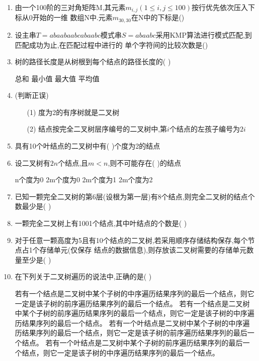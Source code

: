 \documentclass[12pt, a4paper, oneside, UTF8]{ctexbook}
\begin{document}
\begin{enumerate}
    \item \bl 由一个100阶的三对角矩阵M,其元素$m_{i,j}(1\leq i, j\leq 100)$按行优先依次压入下标从0开始的一维
    数组N中.元素$m_{30,30}$在N中的下标是() 

    \item \bl 设主串$T=abaabaabcabaabc$模式串$S=abaabc$采用KMP算法进行模式匹配,到匹配成功为止,在匹配过程中进行的
    单个字符间的比较次数是()
    

    \item 树的路径长度是从树根到每个结点的路径长度的(   ) 
    \begin{choices}
        \task 总和
        \task 最小值
        \task 最大值
        \task 平均值
    \end{choices}

    \item (判断正误) 
    \begin{enumerate}
        \item [(1)] 度为2的有序树就是二叉树
        \item [(2)] 结点按完全二叉树层序编号的二叉树中,第$i$个结点的左孩子编号为$2i$ 
    \end{enumerate}
    


    \item 具有10个叶结点的二叉树中有(   )个度为2的结点 
    

    \item 设二叉树有$2n$个结点,且$m<n$,则不可能存在(   )的结点 
    \begin{choices}
        \task n个度为0
        \task 2m个度为0
        \task 2m个度为1
        \task 2m个度为2
    \end{choices}


    \item 已知一颗完全二叉树的第6层(设根为第一层)有8个结点,则完全二叉树的结点个数最少是(   ) 


    \item 一颗完全二叉树上有1001个结点,其中叶结点的个数是(    ) 

    \item \bl 对于任意一颗高度为5且有10个结点的二叉树,若采用顺序存储结构保存,每个节点占1个存储单元(仅保存
    结点的数据信息),则存放该二叉树需要的存储单元数量至少是(     ) 


    \item 在下列关于二叉树遍历的说法中,正确的是(     ) 
    \begin{choices}[1]
    \task 若有一个结点是二叉树中某个子树的中序遍历结果序列的最后一个结点，则它一定是该子树的前序遍历结果序列的最后一个结点。
    \task 若有一个结点是二叉树中某个子树的前序遍历结果序列的最后一个结点，则它一定是该子树的中序遍历结果序列的最后一个结点。
    \task 若有一个叶结点是二叉树中某个子树的中序遍历结果序列的最后一个结点，则它一定是该子树的前序遍历结果序列的最后一个结点。
    \task 若有一个叶结点是二叉树中某个子树的前序遍历结果序列的最后一个结点，则它一定是该子树的中序遍历结果序列的最后一个结点。
    \end{choices} 



\end{enumerate}
\end{document}

